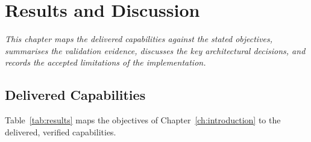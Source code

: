 \chapter{Results and Discussion}
\label{ch:results}

\begin{center}
\textit{This chapter maps the delivered capabilities against the stated
objectives, summarises the validation evidence, discusses the key
architectural decisions, and records the accepted limitations of the
implementation.}
\end{center}

\vspace*{\fill}
\clearpage
\section{Delivered Capabilities}

\noindent Table~\ref{tab:results} maps the objectives of
Chapter~\ref{ch:introduction} to the delivered, verified capabilities.

